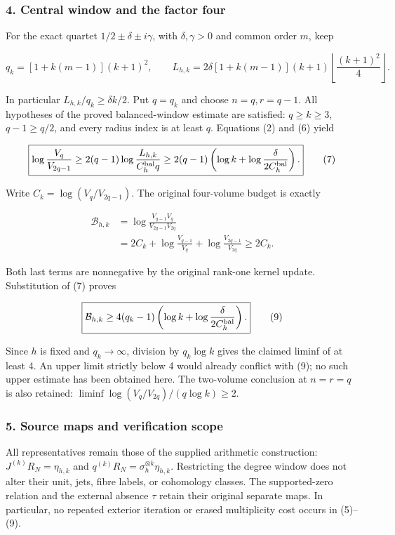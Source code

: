 \subsubsection{4. Central window and the factor four}\label{endpoint-four_volume_threshold--central-window-and-the-factor-four}

For the exact quartet \(1/2\pm\delta\pm i\gamma\), with \(\delta,\gamma>0\) and common order \(m\), keep

\[
q_k=[1+k(m-1)](k+1)^2,\qquad
L_{h,k}=2\delta[1+k(m-1)](k+1)
\left\lfloor\frac{(k+1)^2}{4}\right\rfloor.
\]

In particular \(L_{h,k}/q_k\ge\delta k/2\). Put \(q=q_k\) and choose \(n=q,r=q-1\). All hypotheses of the proved balanced-window estimate are satisfied: \(q\ge k\ge3\), \(q-1\ge q/2\), and every radius index is at least \(q\). Equations (2) and (6) yield

\[
\boxed{\log\frac{V_q}{V_{2q-1}}
\ge2(q-1)\log\frac{L_{h,k}}{C_h^{\rm bal}q}
\ge2(q-1)\left(\log k+\log\frac{\delta}{2C_h^{\rm bal}}\right).}
\tag{7}
\]

Write \(C_k=\log(V_q/V_{2q-1})\). The original four-volume budget is exactly

\[
\begin{aligned}
\mathcal B_{h,k}
&=\log\frac{V_{q-1}V_q}{V_{2q-1}V_{2q}}\\
&=2C_k+\log\frac{V_{q-1}}{V_q}
              +\log\frac{V_{2q-1}}{V_{2q}}\ge2C_k.
\end{aligned}
\tag{8}
\]

Both last terms are nonnegative by the original rank-one kernel update. Substitution of (7) proves

\[
\boxed{\mathcal B_{h,k}\ge
4(q_k-1)\left(\log k+\log\frac{\delta}{2C_h^{\rm bal}}\right).}
\tag{9}
\]

Since \(h\) is fixed and \(q_k\to\infty\), division by \(q_k\log k\) gives the claimed liminf of at least 4. An upper limit strictly below 4 would already conflict with (9); no such upper estimate has been obtained here. The two-volume conclusion at \(n=r=q\) is also retained: \(\liminf \log(V_q/V_{2q})/(q\log k)\ge2\).

\subsubsection{5. Source maps and verification scope}\label{endpoint-four_volume_threshold--source-maps-and-verification-scope}

All representatives remain those of the supplied arithmetic construction: \(J^{(k)}R_N=\eta_{h,k}\) and \(q^{(k)}R_N=\sigma_h^{\otimes k}\eta_{h,k}\). Restricting the degree window does not alter their unit, jets, fibre labels, or cohomology classes. The supported-zero relation and the external absence \(\tau\) retain their original separate maps. In particular, no repeated exterior iteration or erased multiplicity cost occurs in (5)--(9).

